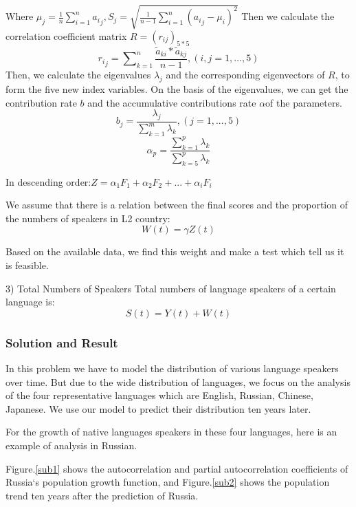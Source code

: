 Where ${{\mu }_{j}}=\frac{1}{n}\sum\nolimits_{i=1}^{n}{{{a}_{i}}_{j}},{{S}_{j}}=\sqrt{\frac{1}{n-1}\sum\nolimits_{i=1}^{n}{{{({{a}_{i}}_{j}-{{\mu }_{i}})}^{2}}}}$
Then we calculate the correlation coefficient matrix $R={{({{r}_{ij}})}_{5*5}}$
\[{r_i}_j = \sum\nolimits_{k = 1}^n {\frac{{{{\widetilde a}_{ki}}*{{\widetilde a}_{kj}}}}{{n - 1}}} ,(i,j = 1,...,5)\]
Then, we calculate the eigenvalues ${{\lambda }_{j}}$ and the corresponding eigenvectors of $R$, to form the five new index variables. On the basis of the eigenvalues, we can get the contribution rate $b$ and the accumulative contributions rate $\alpha $of the parameters.
\[{b_j} = \frac{{{\lambda _j}}}{{\sum\nolimits_{k = 1}^m {{\lambda _k}} }},(j = 1,...,5)\]
\[{\alpha _p} = \frac{{\sum\nolimits_{k = 1}^p {{\lambda _k}} }}{{\sum\nolimits_{k = 5}^p {{\lambda _k}} }}\]

In descending order:$Z = {\alpha _1}{F_1} + {\alpha _2}{F_2} + ... + {\alpha _i}{F_i}$

We assume that there is a relation between the final scores and the proportion of the numbers of speakers in L2 country:
\[W(t) = \gamma Z(t)\]

Based on the available data, we find this weight and make a test which tell us it is feasible.

    3) Total Numbers of Speakers
    Total numbers of language speakers of a certain language is:
    \[S(t) = Y(t) + W(t)\]
\subsubsection{Solution and Result}
        In this problem we have to model the distribution of various language speakers over time. But due to the wide distribution of languages, we focus on the analysis of the four representative languages which are English, Russian, Chinese, Japanese. We use our model to predict their distribution ten years later.

For the growth of native languages speakers in these four languages, here is an example of analysis in Russian.

Figure.\ref{sub1} shows the autocorrelation and partial autocorrelation coefficients of Russia`s population growth function, and Figure.\ref{sub2} shows the population trend ten years after the prediction of Russia.

